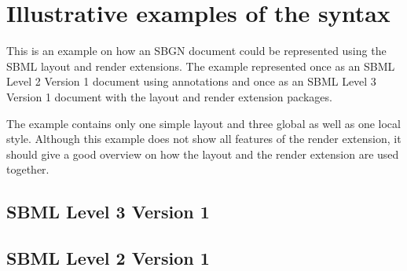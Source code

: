 
\section{Illustrative examples of the \Render syntax}
\label{examples}


This is an example on how an SBGN document could be represented using the SBML layout and render extensions. The example represented once as an SBML Level 2 Version 1 document using annotations and once as an SBML Level 3 Version 1 document with the layout and render extension packages.

The example contains only one simple layout and three global as well as one local style.
Although this example does not show all features of the render extension, it should give a good overview on how the layout and the render extension are used together.

\subsection*{SBML Level 3 Version 1}


\subsection*{SBML Level 2 Version 1}





